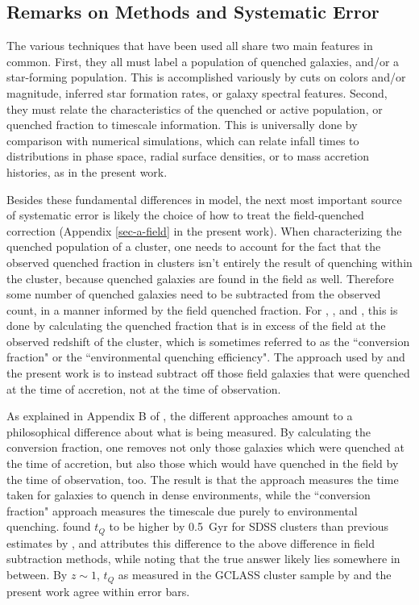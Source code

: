 \subsection{Remarks on Methods and Systematic Error}

The various techniques that have been used all share two main features in common.
First, they all must label a population of quenched galaxies, and/or a star-forming population.
This is accomplished variously by cuts on colors and/or magnitude, inferred star formation rates, or galaxy spectral features.
Second, they must relate the characteristics of the quenched or active population, or quenched fraction to timescale information.
This is universally done by comparison with numerical simulations, which can relate infall times to distributions in phase space, radial surface densities, or to mass accretion histories, as in the present work.

Besides these fundamental differences in model, the next most important source of systematic error is likely the choice of how to treat the field-quenched correction (Appendix \ref{sec-a-field} in the present work).
When characterizing the quenched population of a cluster, one needs to account for the fact that the observed quenched fraction in clusters isn't entirely the result of quenching within the cluster, because quenched galaxies are found in the field as well.
Therefore some number of quenched galaxies need to be subtracted from the observed count, in a manner informed by the field quenched fraction.
For \citet{McGee:2011aa}, \citet{Balogh:2016aa}, and \cite{Fossati:2017aa}, this is done by calculating the quenched fraction that is in excess of the field at the observed redshift of the cluster, which is sometimes referred to as the ``conversion fraction" or the ``environmental quenching efficiency".
The approach used by \citet{Wetzel:2013aa} and the present work is to instead subtract off those field galaxies that were quenched at the time of accretion, not at the time of observation.

As explained in Appendix B of \citet{Balogh:2016aa}, the different approaches amount to a philosophical difference about what is being measured.
By calculating the conversion fraction, one removes not only those galaxies which were quenched at the time of accretion, but also those which would have quenched in the field by the time of observation, too.
The result is that the \citet{Wetzel:2013aa} approach measures the time taken for galaxies to quench in dense environments, while the ``conversion fraction" approach measures the timescale due purely to environmental quenching.
\citet{Balogh:2016aa} found $t_Q$ to be higher by 0.5~Gyr for SDSS clusters than previous estimates by \citet{Wetzel:2013aa}, and attributes this difference to the above difference in field subtraction methods, while noting that the true answer likely lies somewhere in between.
By $z\sim1$, $t_Q$ as measured in the GCLASS cluster sample by \citet{Balogh:2016aa} and the present work agree within error bars.

